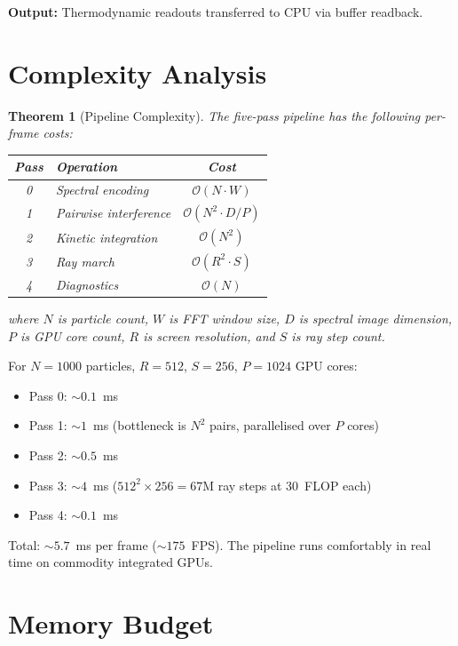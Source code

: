 \documentclass[twocolumn,10pt,a4paper]{article}
\theoremstyle{plain}
\newtheorem{theorem}{Theorem}[section]
\theoremstyle{definition}
\theoremstyle{remark}
\newcommand{\BigO}{\mathcal{O}}
\begin{document}
\textbf{Output:} Thermodynamic readouts transferred to CPU via buffer readback.

\section{Complexity Analysis}
\label{sec:complexity}

\begin{theorem}[Pipeline Complexity]
The five-pass pipeline has the following per-frame costs:
\begin{center}
\begin{tabular}{clc}
\toprule
Pass & Operation & Cost \\
\midrule
0 & Spectral encoding & $\BigO(N \cdot W)$ \\
1 & Pairwise interference & $\BigO(N^2 \cdot D/P)$ \\
2 & Kinetic integration & $\BigO(N^2)$ \\
3 & Ray march & $\BigO(R^2 \cdot S)$ \\
4 & Diagnostics & $\BigO(N)$ \\
\bottomrule
\end{tabular}
\end{center}
where $N$ is particle count, $W$ is FFT window size, $D$ is spectral image dimension, $P$ is GPU core count, $R$ is screen resolution, and $S$ is ray step count.
\end{theorem}

For $N = 1000$ particles, $R = 512$, $S = 256$, $P = 1024$ GPU cores:
\begin{itemize}
    \item Pass 0: $\sim 0.1$~ms
    \item Pass 1: $\sim 1$~ms (bottleneck is $N^2$ pairs, parallelised over $P$ cores)
    \item Pass 2: $\sim 0.5$~ms
    \item Pass 3: $\sim 4$~ms ($512^2 \times 256 = 67$M ray steps at 30~FLOP each)
    \item Pass 4: $\sim 0.1$~ms
\end{itemize}

Total: $\sim 5.7$~ms per frame ($\sim 175$~FPS). The pipeline runs comfortably in real time on commodity integrated GPUs.

\section{Memory Budget}
\label{sec:memory}
\end{document}
